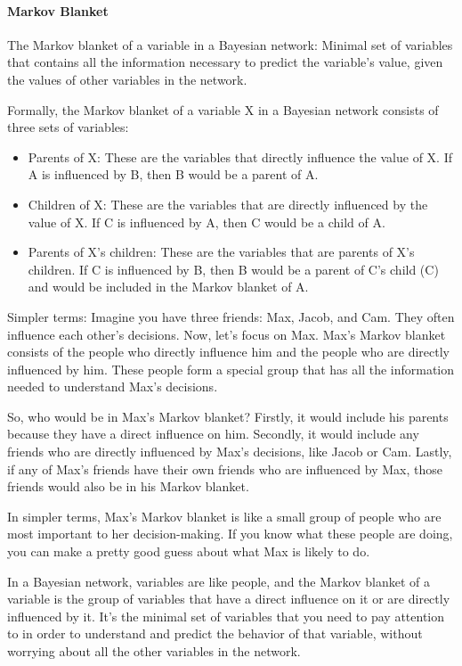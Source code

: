 \documentclass{article}
\begin{document}
\paragraph{Markov Blanket}
The Markov blanket of a variable in a Bayesian network: Minimal set of variables that contains all the information necessary to predict the variable's value, given the values of other variables in the network.

Formally, the Markov blanket of a variable X in a Bayesian network consists of three sets of variables:
\begin{itemize}
  \item Parents of X: These are the variables that directly influence the value of X. If A is influenced by B, then B would be a parent of A.
  \item Children of X: These are the variables that are directly influenced by the value of X. If C is influenced by A, then C would be a child of A.
  \item Parents of X's children: These are the variables that are parents of X's children. If C is influenced by B, then B would be a parent of C's child (C) and would be included in the Markov blanket of A.
\end{itemize}

Simpler terms: Imagine you have three friends: Max, Jacob, and Cam. 
They often influence each other's decisions. Now, let's focus on Max. Max's Markov blanket consists of the people who directly influence him and the people who are directly influenced by him. These people form a special group that has all the information needed to understand Max's decisions.

So, who would be in Max's Markov blanket? Firstly, it would include his parents because they have a direct influence on him. Secondly, it would include any friends who are directly influenced by Max's decisions, like Jacob or Cam. Lastly, if any of Max's friends have their own friends who are influenced by Max, those friends would also be in his Markov blanket.

In simpler terms, Max's Markov blanket is like a small group of people who are most important to her decision-making. If you know what these people are doing, you can make a pretty good guess about what Max is likely to do.

In a Bayesian network, variables are like people, and the Markov blanket of a variable is the group of variables that have a direct influence on it or are directly influenced by it. It's the minimal set of variables that you need to pay attention to in order to understand and predict the behavior of that variable, without worrying about all the other variables in the network.
\end{document}
